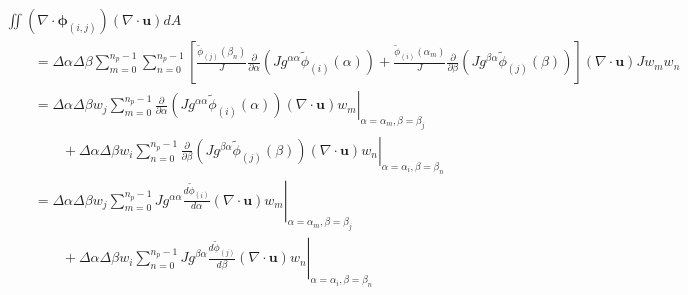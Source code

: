 \documentclass{article}
\newcommand{\vb}{\mathbf}
\newcommand{\vg}{\boldsymbol}
\newcommand{\diff}[2]{\frac{d #1}{d #2}}
\newcommand{\pdiff}[2]{\frac{\partial #1}{\partial #2}}
\begin{document}
\begin{align}
& \iint (\nabla \cdot \vg{\phi}_{(i,j)}) (\nabla \cdot \vb{u}) dA \nonumber \\
& \qquad = \Delta \alpha \Delta \beta \sum_{m=0}^{n_p-1} \sum_{n=0}^{n_p-1} \left[ \frac{\tilde{\phi}_{(j)}(\beta_n)}{J} \pdiff{}{\alpha} \left( J g^{\alpha \alpha} \tilde{\phi}_{(i)}(\alpha) \right)  + \frac{\tilde{\phi}_{(i)}(\alpha_m)}{J} \pdiff{}{\beta} \left( J g^{\beta \alpha} \tilde{\phi}_{(j)}(\beta) \right) \right] (\nabla \cdot \vb{u}) J w_m w_n \\
& \qquad = \Delta \alpha \Delta \beta w_j \sum_{m = 0}^{n_p-1} \left. \pdiff{}{\alpha} \left( J g^{\alpha \alpha} \tilde{\phi}_{(i)}(\alpha) \right) (\nabla \cdot \vb{u}) w_m \right\vert_{\alpha = \alpha_m, \beta = \beta_j} \nonumber \\
& \qquad \qquad + \Delta \alpha \Delta \beta w_i \sum_{n = 0}^{n_p-1} \left. \pdiff{}{\beta} \left( J g^{\beta \alpha} \tilde{\phi}_{(j)}(\beta) \right) (\nabla \cdot \vb{u}) w_n \right\vert_{\alpha = \alpha_i, \beta = \beta_n} \\
& \qquad = \Delta \alpha \Delta \beta w_j \sum_{m = 0}^{n_p-1} \left. J g^{\alpha \alpha} \diff{\tilde{\phi}_{(i)}}{\alpha} (\nabla \cdot \vb{u}) w_m \right\vert_{\alpha = \alpha_m, \beta = \beta_j} \nonumber \\
& \qquad \qquad + \Delta \alpha \Delta \beta w_i \sum_{n = 0}^{n_p-1} \left. J g^{\beta \alpha} \diff{\tilde{\phi}_{(j)}}{\beta} (\nabla \cdot \vb{u}) w_n \right\vert_{\alpha = \alpha_i, \beta = \beta_n} \label{eq:VecHyperviscosityZeroBetaDiv}
\end{align}
\end{document}
